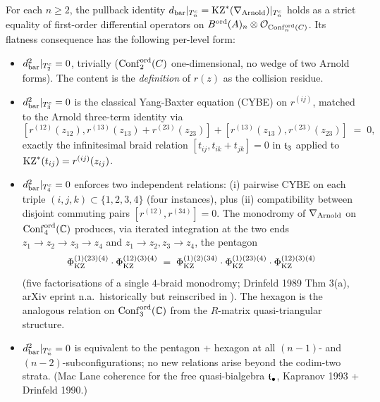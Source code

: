 \begin{theorem}\ClaimStatusTheorem
\label{thm:level-by-level-g2}
For each $n \ge 2$, the pullback identity
$\dbar|_{T^c_n} = \KZ^{*}(\nabla_{\Arnold})|_{T^c_n}$ holds as a strict
equality of first-order differential operators on
$\BarOrd(A)_n \otimes \mathcal{O}_{\Confnord[n]{C}}$. Its flatness
consequence has the following per-level form:
\begin{itemize}
\item[$n = 2$] $\dbar^2|_{T^c_2} = 0$, trivially
   ($\Confnord[2]{C}$ one-dimensional, no wedge of two Arnold forms).
   The content is the \emph{definition} of $r(z)$ as the collision residue.

\item[$n = 3$] $\dbar^2|_{T^c_3} = 0$ is the classical Yang-Baxter
   equation (CYBE) on $r^{(ij)}$, matched to the Arnold three-term
   identity via
   \[
      [r^{(12)}(z_{12}), r^{(13)}(z_{13}) + r^{(23)}(z_{23})]
      + [r^{(13)}(z_{13}), r^{(23)}(z_{23})]
      \;=\; 0,
   \]
   exactly the infinitesimal braid relation
   $[t_{ij}, t_{ik} + t_{jk}] = 0$ in $\ft_3$ applied to
   $\KZ^{*}(t_{ij}) = r^{(ij)}(z_{ij})$.

\item[$n = 4$] $\dbar^2|_{T^c_4} = 0$ enforces two independent
   relations:
   (i) pairwise CYBE on each triple $(i,j,k) \subset \{1,2,3,4\}$
   (four instances), plus
   (ii) compatibility between disjoint commuting pairs
   $[r^{(12)}, r^{(34)}] = 0$.
   The monodromy of $\nabla_{\Arnold}$ on $\Confnord[4]{\CC}$ produces,
   via iterated integration at the two ends $z_1 \to z_2 \to z_3 \to z_4$
   and $z_1 \to z_2, z_3 \to z_4$, the pentagon
   \[
      \Phi_{\KZ}^{(1)(23)(4)} \cdot \Phi_{\KZ}^{(12)(3)(4)}
      \;=\; \Phi_{\KZ}^{(1)(2)(34)} \cdot \Phi_{\KZ}^{(1)(23)(4)} \cdot \Phi_{\KZ}^{(12)(3)(4)}
   \]
   (five factorisations of a single $4$-braid monodromy;
   Drinfeld 1989 Thm 3(a), arXiv eprint n.a.\ historically but
   reinscribed in \cite[Thm 3.3]{Bar-Natan97}).
   The hexagon is the analogous relation on $\Confnord[3]{\CC}$ from
   the $R$-matrix quasi-triangular structure.

\item[$n \ge 5$] $\dbar^2|_{T^c_n} = 0$ is equivalent to the pentagon +
   hexagon at all $(n-1)$- and $(n-2)$-subconfigurations; no new
   relations arise beyond the codim-two strata.
   (Mac Lane coherence for the free quasi-bialgebra $\ft_\bullet$,
   Kapranov 1993 + Drinfeld 1990.)
\end{itemize}
\end{theorem}

